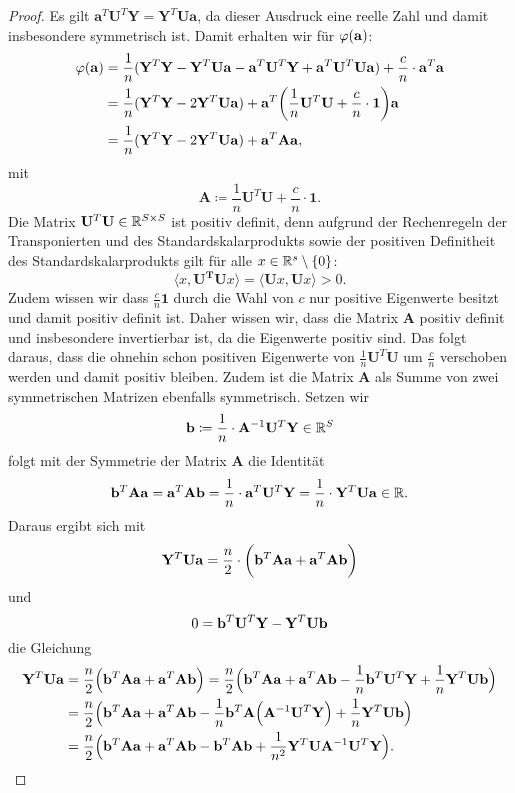 \begin{proof}
Es gilt $\mathbf{a}^T\mathbf{U}^T\mathbf{Y} = \mathbf{Y}^T\mathbf{U}\mathbf{a}$, da dieser Ausdruck eine reelle Zahl und damit insbesondere symmetrisch ist. Damit erhalten wir für $\varphi(\mathbf{a})$:
\begin{equation}
\label{eq:matrix}
\begin{split}
\varphi(\mathbf{a}) & =   \frac{1}{n}(\mathbf{Y}^T\mathbf{Y} - \mathbf{Y}^T\mathbf{U}\mathbf{a} - \mathbf{a}^T\mathbf{U}^T\mathbf{Y} + \mathbf{a}^T\mathbf{U}^T\mathbf{U}\mathbf{a}) + \frac{c}{n} \cdot \mathbf{a}^T\mathbf{a} \\
& = \frac{1}{n}(\mathbf{Y}^T\mathbf{Y} - 2\mathbf{Y}^T\mathbf{U}\mathbf{a}) + \mathbf{a}^T\bigg(\frac{1}{n} \mathbf{U}^T\mathbf{U} + \frac{c}{n} \cdot \mathbf{1}\bigg) \mathbf{a} \\
& = \frac{1}{n}(\mathbf{Y}^T\mathbf{Y} - 2\mathbf{Y}^T\mathbf{U}\mathbf{a}) + \mathbf{a}^T \mathbf{A} \mathbf{a},
\end{split}
\end{equation} 
mit $$\mathbf{A} \coloneqq \frac{1}{n}\mathbf{U}^T\mathbf{U} + \frac{c}{n} \cdot \mathbf{1}.$$
Die Matrix $\mathbf{U}^T\mathbf{U} \in \mathbb{R}^{S \times S}$ ist positiv definit, denn aufgrund der Rechenregeln der Transponierten und des Standardskalarprodukts sowie der positiven Definitheit des Standardskalarprodukts gilt für alle $x \in \mathbb{R}^s\setminus\{0\}$:
$$\langle x, \mathbf{U^T}\mathbf{U} x\rangle = \langle \mathbf{U} x, \mathbf{U} x\rangle > 0.$$
Zudem wissen wir dass $\frac{c}{n}\mathbf{1}$ durch die Wahl von $c$ nur positive Eigenwerte besitzt und damit positiv definit ist.  
Daher wissen wir, dass die Matrix
$\mathbf{A}$ positiv definit und insbesondere invertierbar ist, da die Eigenwerte positiv sind. Das folgt daraus, dass die ohnehin schon positiven Eigenwerte von $\frac{1}{n}\mathbf{U}^T\mathbf{U}$ um $\frac{c}{n}$ verschoben werden und damit positiv bleiben. Zudem ist die Matrix $\mathbf{A}$ als Summe von zwei symmetrischen Matrizen ebenfalls symmetrisch. 
Setzen wir $$\mathbf{b} \coloneqq \frac{1}{n} \cdot \mathbf{A}^{-1}\mathbf{U}^T\mathbf{Y} \in \mathbb{R}^S$$ folgt mit der Symmetrie der Matrix $\mathbf{A}$ die Identität $$\mathbf{b}^T\mathbf{A}\mathbf{a} = \mathbf{a}^T\mathbf{A}\mathbf{b} = \frac{1}{n} \cdot \mathbf{a}^T\mathbf{U}^T\mathbf{Y} = \frac{1}{n} \cdot \mathbf{Y}^T\mathbf{U}\mathbf{a} \in \mathbb{R}.$$ Daraus ergibt sich mit
$$ \mathbf{Y}^T\mathbf{U}\mathbf{a} = \frac{n}{2} \cdot \bigg( \mathbf{b}^T\mathbf{A}\mathbf{a} + \mathbf{a}^T\mathbf{A}\mathbf{b} \bigg) $$
und $$0 = \mathbf{b}^T\mathbf{U}^T\mathbf{Y} - \mathbf{Y}^T\mathbf{U}\mathbf{b}$$
die Gleichung 
\begin{equation}
\begin{split}
 \mathbf{Y}^T\mathbf{U}\mathbf{a} & = \frac{n}{2} \Big(\mathbf{b}^T\mathbf{A}\mathbf{a} + \mathbf{a}^T\mathbf{A}\mathbf{b}\Big) = \frac{n}{2}\Big( \mathbf{b}^T\mathbf{A}\mathbf{a} + \mathbf{a}^T\mathbf{A}\mathbf{b} - \frac{1}{n}\mathbf{b}^T\mathbf{U}^T\mathbf{Y} + \frac{1}{n}\mathbf{Y}^T\mathbf{U}\mathbf{b} \Big)\\
 & = \frac{n}{2} \Big( \mathbf{b}^T\mathbf{A}\mathbf{a} + \mathbf{a}^T\mathbf{A}\mathbf{b} - \frac{1}{n}\mathbf{b}^T\mathbf{A}\Big(\mathbf{A}^{-1}\mathbf{U}^T\mathbf{Y}\Big) + \frac{1}{n}\mathbf{Y}^T\mathbf{U}\mathbf{b} \Big)\\
& = \frac{n}{2} \Big(\mathbf{b}^T\mathbf{A}\mathbf{a} + \mathbf{a}^T\mathbf{A}\mathbf{b} - \mathbf{b}^T\mathbf{A}\mathbf{b} + \frac{1}{n^2}\mathbf{Y}^T\mathbf{U}\mathbf{A}^{-1}\mathbf{U}^T\mathbf{Y} \Big).
\end{split}
\end{equation}


\end{proof}

